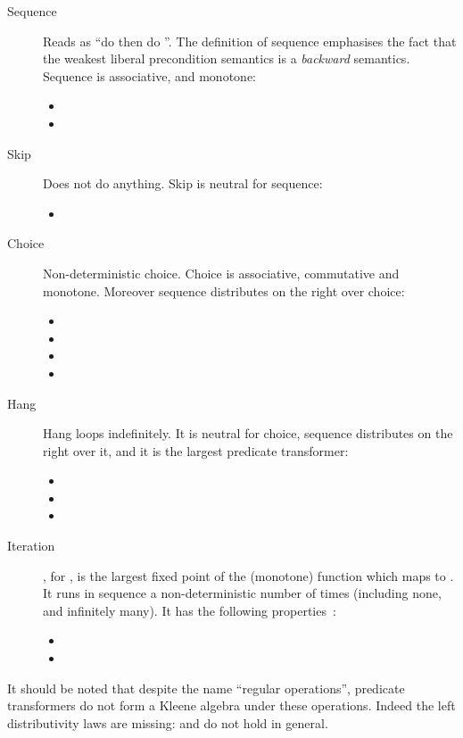\documentclass[]{llncs}
\begin{document}
  \begin{description}
    \item[Sequence] 
\par
Reads as ``do  then do ''. The definition of sequence emphasises the fact that the weakest liberal precondition semantics is a \emph{backward} semantics. Sequence is associative, and monotone:
                  \begin{itemize}
      \item 
      \item 
    \end{itemize}
    \item[Skip] 
\par
Does not do anything. Skip is neutral for sequence:
              \begin{itemize}
      \item 
    \end{itemize}
    \item[Choice] 
\par
Non-deterministic choice. Choice is associative, commutative and monotone. Moreover sequence distributes on the right over choice:
                \begin{itemize}
      \item 
      \item 
      \item 
      \item 
    \end{itemize}
    \item[Hang] 
\par
Hang loops indefinitely. It is neutral for choice, sequence distributes on the right over it, and it is the largest predicate transformer:
               \begin{itemize}
      \item 
      \item 
      \item 
    \end{itemize}
    \item[Iteration] , for , is the largest fixed point of the (monotone) function which maps  to . It runs  in sequence a non-deterministic number of times (including none, and infinitely many). It has the following properties~\cite[Chapter 21]{Back1998}:
               \begin{itemize}
      \item 
      \item 
    \end{itemize}
  \end{description}
\par
It should be noted that despite the name ``regular operations'', predicate transformers do not form a Kleene algebra under these operations. Indeed the left distributivity laws are missing:  and  do not hold in general.
\par
\end{document}
